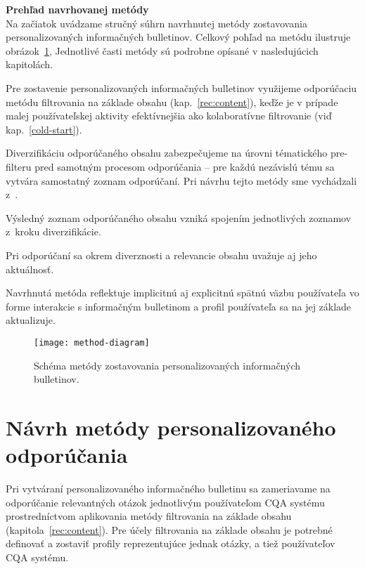 \textbf{Prehľad navrhovanej metódy}\\
Na začiatok uvádzame stručný súhrn navrhnutej metódy zostavovania personalizovaných informačných bulletinov.
Celkový pohľad na metódu ilustruje obrázok~\ref{fig:overview}, Jednotlivé časti metódy sú podrobne opísané v nasledujúcich kapitolách.
\begin{my_itemize}
\item{
    Pre zostavenie personalizovaných informačných bulletinov využijeme odporúčaciu metódu filtrovania na základe obsahu
    (kap.~\ref{rec:content}), keďže je v prípade malej používateľskej aktivity efektívnejšia ako kolaboratívne filtrovanie
    (viď kap.~\ref{cold-start}).
}
\item{
    Diverzifikáciu odporúčaného obsahu zabezpečujeme na úrovni tématického pre-filteru pred samotným procesom
    odporúčania -- pre každú nezávislú tému sa vytvára samostatný zoznam odporúčaní.
    Pri návrhu tejto metódy sme vychádzali z~\cite{Szpektor2013}.
}
\item{Výsledný zoznam odporúčaného obsahu vzniká spojením jednotlivých zoznamov z~kroku diverzifikácie.}
\item{Pri odporúčaní sa okrem diverznosti a relevancie obsahu uvažuje aj jeho aktuálnosť.}
\item{
    Navrhnutá metóda reflektuje implicitnú aj explicitnú spätnú väzbu používateľa vo forme interakcie
    s informačným bulletinom a profil používateľa sa na jej základe aktualizuje.
}
\end{my_itemize}

\begin{figure}[H]\begin{center}
\texttt{[image: method-diagram]}
\caption{Schéma metódy zostavovania personalizovaných informačných bulletinov.\label{fig:overview}}\end{center}
\end{figure}

\section{Návrh metódy personalizovaného odporúčania}


Pri vytváraní personalizovaného informačného bulletinu sa zameriavame na odporúčanie relevantných otázok jednotlivým
používateľom CQA systému prostredníctvom aplikovania metódy filtrovania na základe obsahu (kapitola~\ref{rec:content}).
Pre účely filtrovania na základe obsahu je potrebné definovať a zostaviť profily reprezentujúce jednak otázky, a tiež
používateľov CQA systému.

